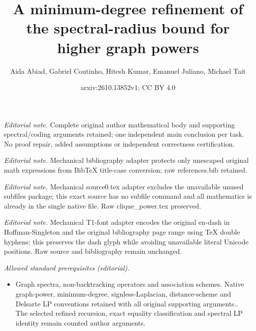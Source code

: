 \documentclass[10pt,a4paper]{article}
\title{A minimum-degree refinement of the spectral-radius bound for higher graph powers}
\author{Aida Abiad, Gabriel Coutinho, Hitesh Kumar, Emanuel Juliano, Michael Tait}
\date{arxiv:2610.13852v1; CC BY 4.0}
\theoremstyle{plain}
\numberwithin{equation}{section}
\begin{document}
\maketitle
\noindent\textit{Editorial note.} Complete original author mathematical body and supporting spectral/coding arguments retained; one independent main conclusion per task. No proof repair, added assumptions or independent correctness certification.\par\medskip
\noindent\textit{Editorial note.} Mechanical bibliography adapter protects only unescaped original math expressions from BibTeX title-case conversion; raw references.bib retained.\par\medskip
\noindent\textit{Editorial note.} Mechanical source0.tex adapter excludes the unavailable unused subfiles package; this exact source has no subfile command and all mathematics is already in the single native file. Raw clique\_power.tex preserved.\par\medskip
\noindent\textit{Editorial note.} Mechanical T1-font adapter encodes the original en-dash in Hoffman-Singleton and the original bibliography page range using TeX double hyphens; this preserves the dash glyph while avoiding unavailable literal Unicode positions. Raw source and bibliography remain unchanged.\par\medskip
\noindent\textit{Allowed standard prerequisites (editorial).}\begin{itemize}
\item Graph spectra, non-backtracking operators and association schemes. Native graph-power, minimum-degree, signless-Laplacian, distance-scheme and Delsarte LP conventions retained with all original supporting arguments.. The selected refined recursion, exact equality classification and spectral LP identity remain counted author arguments.
\end{itemize}\medskip
\end{document}
